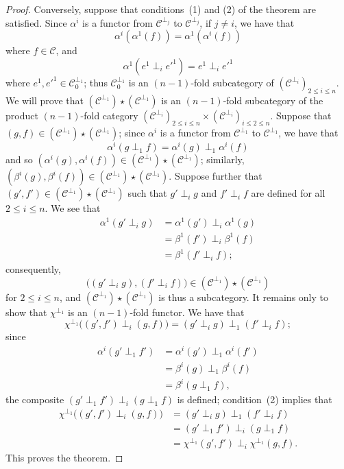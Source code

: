 \documentclass[a4paper,fleqn]{article}
\theoremstyle{plain}
\theoremstyle{definition}
\renewcommand{\leq}{\leqslant}
\newcommand{\oldpage}[1]{{\marginpar{\footnotesize$\bigg\vert$\,\,\,\,\textit{p.~#1}}}}
\newcommand{\CC}{\mathcal{C}}
\begin{document}
\begin{proof}
  Conversely, suppose that conditions~(1) and (2) of the theorem are satisfied.
  Since $\alpha^i$ is a functor from $\CC^{\perp_j}$ to $\CC^{\perp_j}$, if $j\neq i$, we have that
  \[
    \alpha^i(\alpha^1(f))
    = \alpha^1(\alpha^i(f))
  \]
  where $f\in\CC$, and
  \[
    \alpha^1(e^1\perp_i e'^1)
    = e^1\perp_i e'^1
  \]
  where $e^1,e'^1\in\CC_0^{\perp_1}$;
  thus $\CC_0^{\perp_1}$ is an $(n-1)$-fold subcategory of $(\CC^{\perp_i})_{2\leq i\leq n}$.
  We will prove that $(\CC^{\perp_1})\star(\CC^{\perp_1})$ is an $(n-1)$-fold subcategory of the product $(n-1)$-fold category $(\CC^{\perp_i})_{2\leq i\leq n}\times(\CC^{\perp_i})_{i\leq 2\leq n}$.
  Suppose that $(g,f)\in(\CC^{\perp_1})\star(\CC^{\perp_1})$;
  since $\alpha^i$ is a functor from $\CC^{\perp_1}$ to $\CC^{\perp_1}$, we have that
  \[
    \alpha^i(g\perp_1 f)
    = \alpha^i(g)\perp_1\alpha^i(f)
  \]
  and so $(\alpha^i(g),\alpha^i(f))\in(\CC^{\perp_1})\star(\CC^{\perp_1})$;
  similarly, $(\beta^i(g),\beta^i(f))\in(\CC^{\perp_1})\star(\CC^{\perp_1})$.
  Suppose further that $(g',f')\in(\CC^{\perp_1})\star(\CC^{\perp_1})$ such that $g'\perp_i g$ and $f'\perp_i f$ are defined for all $2\leq i\leq n$.
  We see that
  \[
    \begin{aligned}
      \alpha^1(g'\perp_i g)
      &= \alpha^1(g')\perp_i\alpha^1(g)
    \\&= \beta^1(f')\perp_i\beta^1(f)
    \\&= \beta^1(f'\perp_i f);
    \end{aligned}
  \]
  consequently,
  \[
    \big(
      (g'\perp_i g), (f'\perp_i f)
    \big)
    \in(\CC^{\perp_1})\star(\CC^{\perp_1})
  \]
  for $2\leq i\leq n$, and $(\CC^{\perp_1})\star(\CC^{\perp_1})$ is thus a subcategory.
  It remains only to show that $\chi^{\perp_1}$ is an $(n-1)$-fold functor.
  We have that
  \[
    \chi^{\perp_1}\big(
      (g',f')\perp_i(g,f)
    \big)
    = (g'\perp_i g)\perp_1(f'\perp_i f);
  \]
  \oldpage{70}
  since
  \[
    \begin{aligned}
      \alpha^i(g'\perp_1 f')
      &= \alpha^i(g')\perp_1\alpha^i(f')
    \\&= \beta^i(g)\perp_1\beta^i(f)
    \\&= \beta^i(g\perp_1 f),
    \end{aligned}
  \]
  the composite $(g'\perp_1 f')\perp_i(g\perp_1 f)$ is defined;
  condition~(2) implies that
  \[
    \begin{aligned}
      \chi^{\perp_1}\big(
        (g',f')\perp_i(g,f)
      \big)
      &= (g'\perp_i g)\perp_1(f'\perp_i f)
    \\&= (g'\perp_1 f')\perp_i(g\perp_1 f)
    \\&= \chi^{\perp_1}(g',f')\perp_i\chi^{\perp_1}(g,f).
    \end{aligned}
  \]
  This proves the theorem.
\end{proof}
\end{document}
